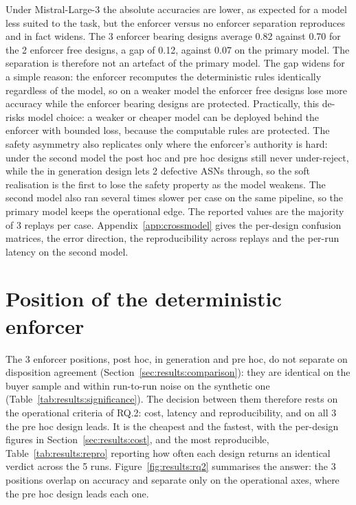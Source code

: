 Under Mistral-Large-3 the absolute accuracies are lower, as expected for a model less suited to the task, but the enforcer versus no enforcer separation reproduces and in fact widens. The 3 enforcer bearing designs average 0.82 against 0.70 for the 2 enforcer free designs, a gap of 0.12, against 0.07 on the primary model. The separation is therefore not an artefact of the primary model. The gap widens for a simple reason: the enforcer recomputes the deterministic rules identically regardless of the model, so on a weaker model the enforcer free designs lose more accuracy while the enforcer bearing designs are protected. Practically, this de-risks model choice: a weaker or cheaper model can be deployed behind the enforcer with bounded loss, because the computable rules are protected. The safety asymmetry also replicates only where the enforcer's authority is hard: under the second model the post hoc and pre hoc designs still never under-reject, while the in generation design lets 2 defective ASNs through, so the soft realisation is the first to lose the safety property as the model weakens. The second model also ran several times slower per case on the same pipeline, so the primary model keeps the operational edge. The reported values are the majority of 3 replays per case. Appendix~\ref{app:crossmodel} gives the per-design confusion matrices, the error direction, the reproducibility across replays and the per-run latency on the second model.


\section{Position of the deterministic enforcer}
\label{sec:results:position}

The 3 enforcer positions, post hoc, in generation and pre hoc, do not separate on disposition agreement (Section~\ref{sec:results:comparison}): they are identical on the buyer sample and within run-to-run noise on the synthetic one (Table~\ref{tab:results:significance}). The decision between them therefore rests on the operational criteria of RQ.2: cost, latency and reproducibility, and on all 3 the pre hoc design leads. It is the cheapest and the fastest, with the per-design figures in Section~\ref{sec:results:cost}, and the most reproducible, Table~\ref{tab:results:repro} reporting how often each design returns an identical verdict across the 5 runs. Figure~\ref{fig:results:rq2} summarises the answer: the 3 positions overlap on accuracy and separate only on the operational axes, where the pre hoc design leads each one.

